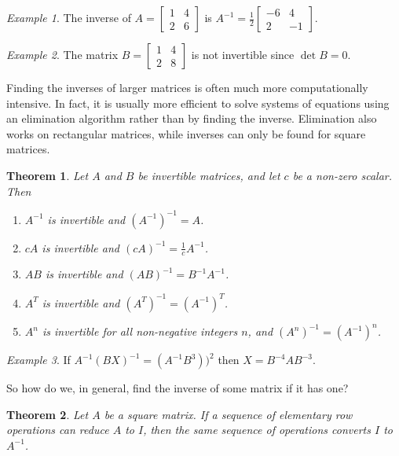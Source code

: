 \documentclass[10pt, a4paper]{amsart}
\newtheorem{thm}{Theorem}
\theoremstyle{definition}
\theoremstyle{remark}
\newtheorem{ex}{Example}
\begin{document}
\begin{ex}
  The inverse of $ A = \begin{bmatrix} 1 & 4 \\ 2 & 6 \end{bmatrix} $ is $ A^{-1} = \frac{1}{2} \begin{bmatrix} -6 & 4 \\ 2 & -1 \end{bmatrix} $.
\end{ex}

\begin{ex}
  The matrix $ B = \begin{bmatrix} 1 & 4 \\ 2 & 8 \end{bmatrix} $ is not invertible since $ \det B = 0 $.
\end{ex}

Finding the inverses of larger matrices is often much more computationally intensive. In fact, it is usually
more efficient to solve systems of equations using an elimination algorithm rather than by finding the inverse.
Elimination also works on rectangular matrices, while inverses can only be found for square matrices.

\begin{thm}
  Let $ A $ and $ B $ be invertible matrices, and let $ c $ be a non-zero scalar. Then
  \begin{enumerate}
    \item $ A^{-1} $ is invertible and $ (A^{-1})^{-1} = A $.
    \item $ cA $ is invertible and $ (cA)^{-1} = \frac{1}{c} A^{-1} $.
    \item $ AB $ is invertible and $ (AB)^{-1} = B^{-1} A^{-1} $.
    \item $ A^T $ is invertible and $ (A^T)^{-1} = (A^{-1})^T $.
    \item $ A^n $ is invertible for all non-negative integers $ n $, and $ (A^n)^{-1} = (A^{-1})^n $.
  \end{enumerate}
\end{thm}

\begin{ex}
  If $ A^{-1} (BX)^{-1} = (A^{-1} B^3))^2 $ then $ X = B^{-4} A B^{-3} $.
\end{ex}

So how do we, in general, find the inverse of some matrix if it has one?

\begin{thm}
  Let $ A $ be a square matrix. If a sequence of elementary row operations can reduce
  $ A $ to $ I $, then the same sequence of operations converts $ I $ to $ A^{-1} $.
\end{thm}
\end{document}
